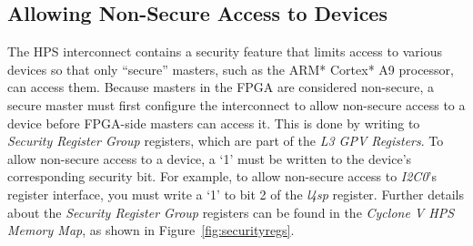 \documentclass[11pt, twoside, pdftex]{article}
\begin{document}

\subsection{Allowing Non-Secure Access to Devices}

The HPS interconnect contains a security feature that limits access to various devices so that only ``secure'' masters, such as the ARM* Cortex* A9 processor, can access them. Because masters in the FPGA are considered non-secure, a secure master must first configure the interconnect to allow non-secure access to a device before FPGA-side masters can access it. This is done by writing to \textit{Security Register Group} registers, which are part of the \textit{L3 GPV Registers}. To allow non-secure access to a device, a `1' must be written to the device's corresponding security bit. For example, to allow non-secure access to \textit{I2C0}'s register interface, you must write a `1' to bit 2 of the \textit{l4sp} register. Further details about the \textit{Security Register Group} registers can be found in the \textit{Cyclone V HPS Memory Map}, as shown in Figure~\ref{fig:securityregs}.
\end{document}
